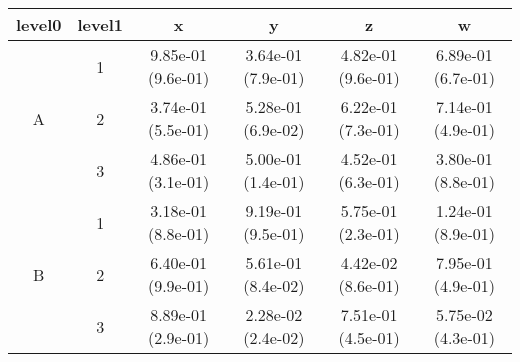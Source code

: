 \begin{tabular}{cccccc}
\toprule
level0 & level1&x&y&z&w\tabularnewline
\midrule
\multirow{3}{*}{A}&1& 9.85e-01 (9.6e-01)& 3.64e-01 (7.9e-01)& 4.82e-01 (9.6e-01)& 6.89e-01 (6.7e-01)\tabularnewline
&2& 3.74e-01 (5.5e-01)& 5.28e-01 (6.9e-02)& 6.22e-01 (7.3e-01)& 7.14e-01 (4.9e-01)\tabularnewline
&3& 4.86e-01 (3.1e-01)& 5.00e-01 (1.4e-01)& 4.52e-01 (6.3e-01)& 3.80e-01 (8.8e-01)\tabularnewline
\midrule
\multirow{3}{*}{B}&1& 3.18e-01 (8.8e-01)& 9.19e-01 (9.5e-01)& 5.75e-01 (2.3e-01)& 1.24e-01 (8.9e-01)\tabularnewline
&2& 6.40e-01 (9.9e-01)& 5.61e-01 (8.4e-02)& 4.42e-02 (8.6e-01)& 7.95e-01 (4.9e-01)\tabularnewline
&3& 8.89e-01 (2.9e-01)& 2.28e-02 (2.4e-02)& 7.51e-01 (4.5e-01)& 5.75e-02 (4.3e-01)\tabularnewline
\bottomrule
\end{tabular}
